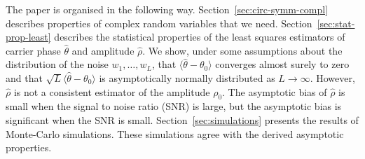 \documentclass{article}
\begin{document}
The paper is organised in the following way.  Section~\ref{sec:circ-symm-compl} describes properties of complex random variables that we need.  Section~\ref{sec:stat-prop-least} describes the statistical properties of the least squares estimators of carrier phase $\hat{\theta}$ and amplitude $\hat{\rho}$.  We show, under some assumptions about the distribution of the noise $w_1,\dots,w_L$, that $\langle\hat{\theta} - \theta_0\rangle$ converges almost surely to zero and that $\sqrt{L}\langle\hat{\theta} - \theta_0\rangle$ is asymptotically normally distributed as $L\rightarrow \infty$.  However, $\hat{\rho}$ is not a consistent estimator of the amplitude $\rho_0$.  The asymptotic bias of $\hat{\rho}$ is small when the signal to noise ratio (SNR) is large, but the asymptotic bias is significant when the SNR is small.  %
Section~\ref{sec:simulations} presents the results of Monte-Carlo simulations.  These simulations agree with the derived asymptotic properties. 




\end{document}
